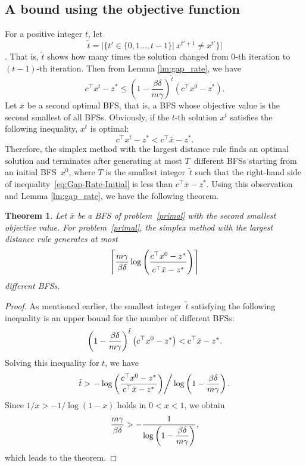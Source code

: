 \documentclass[12pt]{article}
\newtheorem{theorem}{Theorem}[section]
\newcommand{\getheight}{\rule{0em}{2.5ex}}
\begin{document}
\subsection{A bound using the objective function}
For a positive integer $t$, let 
\[\tilde{t}=|\{t'\in\{0,1\dots,t-1\}|~x^{t'+1}\not=x^{t'}\}|\]. 
That is, $\tilde{t}$ shows how many times the solution changed from $0$-th iteration to $(t-1)$-th iteration. 
Then from Lemma \ref{lm:gap_rate}, we have 
\begin{equation} \label{eq:Gap-Rate-Initial}
  c^{\top} x^{t} - z^* \le \left( 1 - \frac{\beta\delta}{m\gamma} \right)^{\tilde{t}} \left( c^{\top} x^0 - z^* \right).
\end{equation}
Let $\bar{x}$ be a second optimal BFS, that is, a BFS whose objective value is the second smallest of all BFSs. 
Obviously, if the $t$-th solution $x^{t}$ satisfies the following inequality, $x^{t}$ is optimal:
\[
  c^{\top} x^t - z^* < c^{\top} \bar{x} - z^*.
\]
Therefore, the simplex method with the largest distance rule finds an optimal solution and terminates 
after generating at most $T$~different BFSs starting from an initial BFS~$x^0$, where $T$ is the smallest integer~$\tilde{t}$ such that the right-hand side of inequality~\eqref{eq:Gap-Rate-Initial} is less than $c^{\top} \bar{x} - z^*$. 
Using this observation and Lemma \ref{lm:gap_rate}, we have the following theorem.
%
\begin{theorem} \label{thm:Upper-Bound-With-Second-Optimal-Ratio}
Let $\bar{x}$ be a BFS of problem~\eqref{primal} with the second smallest objective value.
For problem~\eqref{primal}, the simplex method with the largest distance rule generates at most  
\begin{equation} \label{eq:Upper-Bound-With-Second-Optimal-Ratio}
  \left\lceil \frac{m\gamma}{\beta \delta} \log\left( \frac{\getheight c^{\top}x^0-z^*}{\getheight c^{\top}\bar{x}-z^*} \right) \right\rceil
\end{equation}
different BFSs.
\end{theorem}
\begin{proof}
As mentioned earlier, the smallest integer~$\tilde{t}$ satisfying the following inequality is an upper bound for the number of different BFSs:
\begin{equation} \notag
  \left( 1 - \frac{\beta \delta}{m\gamma} \right)^{\tilde{t}} \left( c^{\top} x^0 - z^* \right) < c^{\top} \bar{x} - z^*.
\end{equation}
Solving this inequality for $t$, we have
\begin{equation}
  \tilde{t} >  \displaystyle \left. -\log\left( \frac{c^{\top}x^0-z^*}  {c^{\top}\bar{x}-z^*}\right) \right/  \log\left(1-\frac{\beta \delta}{m\gamma}\right) .
\end{equation}
Since $ 1/x > -1/\log(1-x) $ holds in $0 < x < 1$, we obtain
\begin{equation} \notag
  \frac{m\gamma}{\beta \delta} > -\frac{1}{\displaystyle\log\left(1-\frac{\beta \delta}{m\gamma}\right)},
\end{equation}
which leads to the theorem. 
\end{proof}
%
\end{document}
